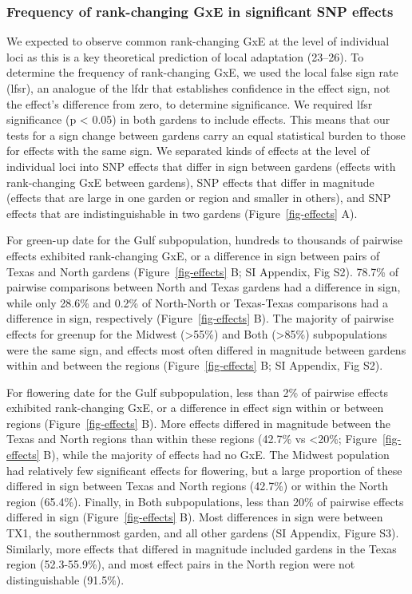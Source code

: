 \documentclass[
  9pt,
  twocolumn,
  twoside]{pnas-new}
\begin{document}
\subsubsection{Frequency of rank-changing GxE in significant SNP
effects}\label{frequency-of-rank-changing-gxe-in-significant-snp-effects}

We expected to observe common rank-changing GxE at the level of
individual loci as this is a key theoretical prediction of local
adaptation (23--26). To determine the frequency of rank-changing GxE, we
used the local false sign rate (lfsr), an analogue of the lfdr that
establishes confidence in the effect sign, not the effect's difference
from zero, to determine significance. We required lfsr significance (p
\textless{} 0.05) in both gardens to include effects. This means that
our tests for a sign change between gardens carry an equal statistical
burden to those for effects with the same sign. We separated kinds of
effects at the level of individual loci into SNP effects that differ in
sign between gardens (effects with rank-changing GxE between gardens),
SNP effects that differ in magnitude (effects that are large in one
garden or region and smaller in others), and SNP effects that are
indistinguishable in two gardens (Figure~\ref{fig-effects} A).

For green-up date for the Gulf subpopulation, hundreds to thousands of
pairwise effects exhibited rank-changing GxE, or a difference in sign
between pairs of Texas and North gardens (Figure~\ref{fig-effects} B; SI
Appendix, Fig S2). 78.7\% of pairwise comparisons between North and
Texas gardens had a difference in sign, while only 28.6\% and 0.2\% of
North-North or Texas-Texas comparisons had a difference in sign,
respectively (Figure~\ref{fig-effects} B). The majority of pairwise
effects for greenup for the Midwest (\textgreater55\%) and Both
(\textgreater85\%) subpopulations were the same sign, and effects most
often differed in magnitude between gardens within and between the
regions (Figure~\ref{fig-effects} B; SI Appendix, Fig S2).

For flowering date for the Gulf subpopulation, less than 2\% of pairwise
effects exhibited rank-changing GxE, or a difference in effect sign
within or between regions (Figure~\ref{fig-effects} B). More effects
differed in magnitude between the Texas and North regions than within
these regions (42.7\% vs \textless20\%; Figure~\ref{fig-effects} B),
while the majority of effects had no GxE. The Midwest population had
relatively few significant effects for flowering, but a large proportion
of these differed in sign between Texas and North regions (42.7\%) or
within the North region (65.4\%). Finally, in Both subpopulations, less
than 20\% of pairwise effects differed in sign (Figure~\ref{fig-effects}
B). Most differences in sign were between TX1, the southernmost garden,
and all other gardens (SI Appendix, Figure S3). Similarly, more effects
that differed in magnitude included gardens in the Texas region
(52.3-55.9\%), and most effect pairs in the North region were not
distinguishable (91.5\%).
\end{document}
